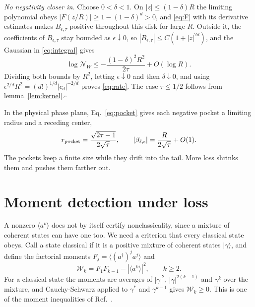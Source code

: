 \documentclass[11pt,a4paper]{article}
\newcommand{\ket}[1]{|#1\rangle}
\newcommand{\ev}[1]{\langle#1\rangle}
\newcommand{\NW}{\mathcal N_W}
\begin{document}
\emph{No negativity closer in.} Choose $0<\delta<1$. On $|z|\le(1-\delta)R$ the limiting polynomial obeys $|F(z/R)|\ge1-(1-\delta)^d>0$, and \eqref{eq:F} with its derivative estimates makes $B_{\epsilon,\tau}$ positive throughout this disk for large $R$. Outside it, the coefficients of $B_{\epsilon,\tau}$ stay bounded as $\epsilon\downarrow0$, so $|B_{\epsilon,\tau}|\le C(1+|z|^{2d})$, and the Gaussian in \eqref{eq:integral} gives
\begin{equation}
 \log\NW\le-\frac{(1-\delta)^2R^2}{2\tau}+O(\log R).
 \label{eq:upper}
\end{equation}
Dividing both bounds by $R^2$, letting $\epsilon\downarrow0$ and then $\delta\downarrow0$, and using $\epsilon^{2/d}R^2=(d!)^{1/d}|c_d|^{-2/d}$ proves \eqref{eq:rate}. The case $\tau\le1/2$ follows from lemma~\ref{lem:kernel}.\hfill$\square$

In the physical phase plane, Eq.~\eqref{eq:pocket} gives each negative pocket a limiting radius and a receding center,
\begin{equation}
 r_{\rm pocket}=\frac{\sqrt{2\tau-1}}{2\sqrt\tau},
 \qquad |\beta_{\ell,\epsilon}|=\frac{R}{2\sqrt\tau}+O(1).
 \label{eq:physical}
\end{equation}
The pockets keep a finite size while they drift into the tail. More loss shrinks them and pushes them farther out.

\section{Moment detection under loss}
\label{sec:moments}

A nonzero $\ev{a^\nu}$ does not by itself certify nonclassicality, since a mixture of coherent states can have one too. We need a criterion that every classical state obeys. Call a state classical if it is a positive mixture of coherent states $\ket\gamma$, and define the factorial moments $F_j=\ev{(a^\dagger)^ja^j}$ and
\begin{equation}
 \mathcal W_k=F_1F_{k-1}-|\ev{a^k}|^2,\qquad k\ge2.
 \label{eq:witness}
\end{equation}
For a classical state the moments are averages of $|\gamma|^2$, $|\gamma|^{2(k-1)}$ and $\gamma^k$ over the mixture, and Cauchy-Schwarz applied to $\gamma^*$ and $\gamma^{k-1}$ gives $\mathcal W_k\ge0$. This is one of the moment inequalities of Ref.~\cite{shchukin2005nonclassical}.
\end{document}
